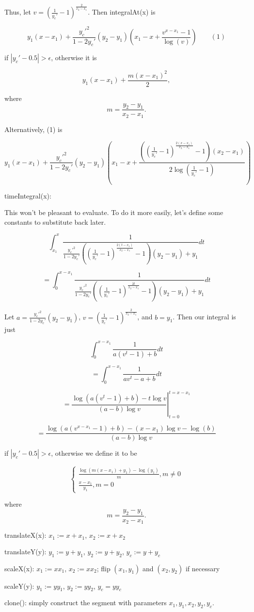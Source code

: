 \documentclass{article}
\begin{document}
Thus, let $v = \left(\frac{1}{y_c'}-1\right)^\frac{2}{x_2-x_1}$. Then integralAt(x) is

$$\boxed{y_1(x-x_1)+\frac{y_c'^2}{1-2y_c'} (y_2-y_1)\left(x_1 - x + \frac{v^{x-x_1}-1}{\log(v)}\right)}\qquad (1)$$

if $|y_c'-0.5| > \epsilon$, otherwise it is

$$y_1(x-x_1) + \frac{m(x-x_1)^2}{2},$$

where $$m=\frac{y_2-y_1}{x_2-x_1}.$$

Alternatively, (1) is 

$$\boxed{y_1(x-x_1)+\frac{y_c'^2}{1-2y_c'} (y_2-y_1)\left(x_1 - x + \frac{\left(\left(\frac{1}{y_c'}-1\right)^\frac{2(x-x_1)}{x_2-x_1}-1\right)(x_2-x_1)}{2\log\left(\frac{1}{y_c'}-1\right)}\right)}$$

timeIntegral(x):

This won't be pleasant to evaluate. To do it more easily, let's define some constants to substitute back later.

$$\int_{x_1}^{x}\frac{1}{\frac{y_c'^2}{1-2y_c'}\left(\left(\frac{1}{y_c'}-1\right)^{\frac{2(t-x_1)}{x_2-x_1}}-1\right)(y_2-y_1)+y_1} dt$$

$$=\int_{0}^{x-x_1}\frac{1}{\frac{y_c'^2}{1-2y_c'}\left(\left(\frac{1}{y_c'}-1\right)^{\frac{2t}{x_2-x_1}}-1\right)(y_2-y_1)+y_1} dt$$

Let $a = \frac{y_c'^2}{1-2y_c'}(y_2-y_1)$, $v=\left(\frac{1}{y_c'}-1\right)^\frac{2}{x_2-x_1}$, and $b=y_1$. Then our integral is just

$$\int_{0}^{x-x_1}\frac{1}{a(v^t-1)+b} dt$$

$$=\int_{0}^{x-x_1}\frac{1}{av^t-a+b} dt$$

$$=\left. \frac{\log(a(v^t-1)+b)-t\log v}{(a-b)\log v} \right\vert ^ {t=x-x_1}_{t=0}$$

$$=\boxed{\frac{\log(a(v^{x-x_1}-1)+b)-(x-x_1)\log v - \log(b)}{(a-b)\log v}}$$

if $|y_c'-0.5| > \epsilon$, otherwise we define it to be

$$\begin{cases}
\frac{\log(m(x-x_1)+y_1)-\log(y_1)}{m}, m\neq 0 \\
\frac{x-x_1}{y_1}, m = 0
\end{cases}$$

where $$m=\frac{y_2-y_1}{x_2-x_1}.$$

translateX(x): $x_1:=x+x_1$, $x_2:=x+x_2$

translateY(y): $y_1:=y+y_1$, $y_2:=y+y_2$, $y_c:=y+y_c$

scaleX(x): $x_1:=xx_1$, $x_2:=xx_2$; flip $(x_1, y_1)$ and $(x_2, y_2)$ if necessary

scaleY(y): $y_1:=yy_1$, $y_2:=yy_2$, $y_c=yy_c$

clone(): simply construct the segment with parameters $x_1, y_1, x_2, y_2, y_c$.
\end{document}
